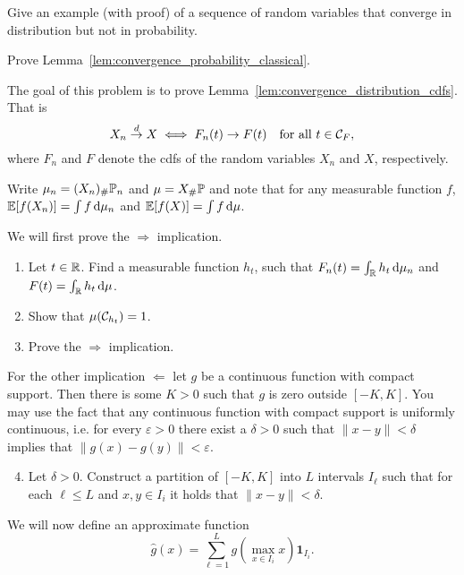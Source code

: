 \begin{problem}\label{prb:dlim_not_plim}
Give an example (with proof) of a sequence of random variables that converge in distribution but not in probability.
\end{problem}

\begin{problem}\label{prb:convergence_probability_classic}
Prove Lemma~\ref{lem:convergence_probability_classical}.
\end{problem}

\begin{problem}\label{prb:convergence_distribution}
The goal of this problem is to prove Lemma~\ref{lem:convergence_distribution_cdfs}. That is
\[
	X_n \stackrel{d}{\rightarrow} X \iff F_n(t) \to F(t) \quad \text{for all } t \in \mathcal C_F,
\]
where $F_n$ and $F$ denote the cdfs of the random variables $X_n$ and $X$, respectively.

Write $\mu_n = (X_n)_\# \mathbb P_n$ and $\mu = X_\# \mathbb P$ and note that for any measurable function $f$, $\mathbb E[f(X_n)] = \int f \, \mathrm{d} \mu_n$ and $\mathbb E[f(X)] = \int f \, \mathrm{d} \mu$.

We will first prove the $\Rightarrow$ implication. 
\begin{enumerate}[label={(\alph*)}]
\item Let $t \in \mathbb R$. Find a measurable function $h_t$, such that $F_n(t) = \int_{\mathbb R} h_t \, \mathrm{d} \mu_n$ and $F(t) = \int_{\mathbb R} h_t \, \mathrm{d} \mu$.
\item Show that $\mu(\mathcal C_{h_t}) = 1$.
\item Prove the $\Rightarrow$ implication. 
\end{enumerate}

For the other implication $\Leftarrow$ let $g$ be a continuous function with compact support. Then there is some $K > 0$ such that $g$ is zero outside $[-K,K]$. You may use the fact that any continuous function with compact support is uniformly continuous, i.e. for every $\varepsilon > 0$ there exist a $\delta > 0$ such that $\|x-y\| < \delta$ implies that $\|g(x) - g(y)\| < \varepsilon$. 
\begin{enumerate}[label={(\alph*)}]
\setcounter{enumi}{3}
\item Let $\delta > 0$. Construct a partition of $[-K,K]$ into $L$ intervals $I_\ell$ such that for each $\ell \le L$ and $x, y \in I_i$ it holds that $\|x - y\| < \delta$.
\end{enumerate}

We will now define an approximate function
\[
	\hat{g}(x) = \sum_{\ell = 1}^L g(\max_{x \in I_i} x) \mathbf{1}_{I_i}.
\]


\end{problem}
